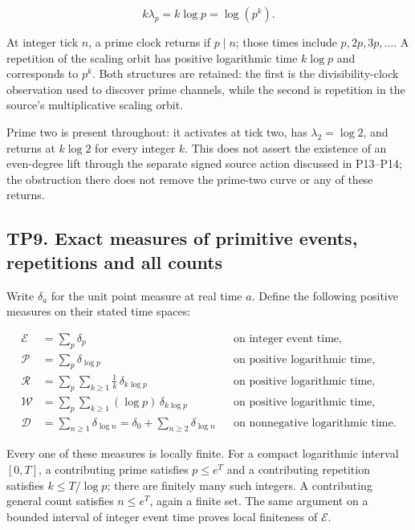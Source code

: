 \documentclass[
]{article}
\begin{document}
\[
k\lambda_p=k\log p=\log(p^k).
\]

At integer tick \(n\), a prime clock returns if \(p\mid n\); those times
include \(p,2p,3p,\ldots\). A repetition of the scaling orbit has
positive logarithmic time \(k\log p\) and corresponds to \(p^k\). Both
structures are retained: the first is the divisibility-clock observation
used to discover prime channels, while the second is repetition in the
source's multiplicative scaling orbit.

Prime two is present throughout: it activates at tick two, has
\(\lambda_2=\log2\), and returns at \(k\log2\) for every integer \(k\).
This does not assert the existence of an even-degree lift through the
separate signed source action discussed in P13--P14; the obstruction
there does not remove the prime-two curve or any of these returns.

\subsection{TP9. Exact measures of primitive events, repetitions and all
counts}\label{tp9.-exact-measures-of-primitive-events-repetitions-and-all-counts}

Write \(\delta_a\) for the unit point measure at real time \(a\). Define
the following positive measures on their stated time spaces:

\[
\begin{aligned}
\mathcal E&=\sum_p\delta_p &&\text{on integer event time},\\
\mathcal P&=\sum_p\delta_{\log p} &&\text{on positive logarithmic time},\\
\mathcal R&=\sum_p\sum_{k\ge1}\frac1k\,\delta_{k\log p}
&&\text{on positive logarithmic time},\\
\mathcal W&=\sum_p\sum_{k\ge1}(\log p)\,\delta_{k\log p}
&&\text{on positive logarithmic time},\\
\mathcal D&=\sum_{n\ge1}\delta_{\log n}
=\delta_0+\sum_{n\ge2}\delta_{\log n}
&&\text{on nonnegative logarithmic time}.
\end{aligned}
\]

Every one of these measures is locally finite. For a compact logarithmic
interval \([0,T]\), a contributing prime satisfies \(p\le e^T\) and a
contributing repetition satisfies \(k\le T/\log p\); there are finitely
many such integers. A contributing general count satisfies \(n\le e^T\),
again a finite set. The same argument on a bounded interval of integer
event time proves local finiteness of \(\mathcal E\).
\end{document}
